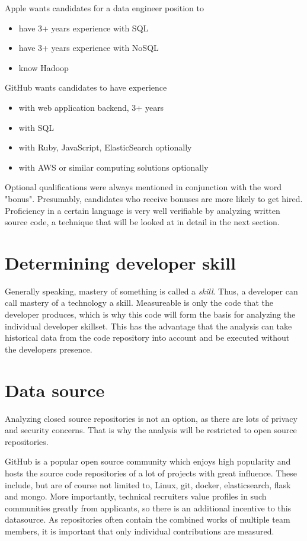 Apple wants candidates for a data engineer position to
\begin{itemize}
    \item have 3+ years experience with SQL
    \item have 3+ years experience with NoSQL
    \item know Hadoop
\end{itemize}

GitHub wants candidates to have experience
\begin{itemize}
    \item with web application backend, 3+ years
    \item with SQL
    \item with Ruby, JavaScript, ElasticSearch optionally
    \item with AWS or similar computing solutions optionally
\end{itemize}

Optional qualifications were always mentioned in conjunction with the
word "bonus". Presumably, candidates who receive bonuses are more
likely to get hired. Proficiency in a certain language is very well
verifiable by analyzing written source code, a technique that will
be looked at in detail in the next section.

\section{Determining developer skill}
Generally speaking, mastery of something is called a \textit{skill}.
Thus, a developer can call mastery of a technology a skill.
Measureable is only the code that the developer produces, which
is why this code will form the basis for analyzing the individual
developer skillset. This has the advantage that the analysis
can take historical data from the code repository into account
and be executed without the developers presence.

\section{Data source}
Analyzing closed source repositories is not an option, as there are lots
of privacy and security concerns. That is why the analysis will be
restricted to open source repositories.
\newline

GitHub is a popular open source community which enjoys high popularity
and hosts the source code repositories of a lot of projects with great influence.
These include, but are of course not limited to,
Linux, git, docker, elasticsearch, flask and mongo\cite{rpfd:2014}.
More importantly, technical recruiters value profiles in such communities
greatly from applicants\cite{md:2013}, so there is an additional
incentive to this datasource. As repositories
often contain the combined works of multiple team members,
it is important that only individual contributions are measured.

